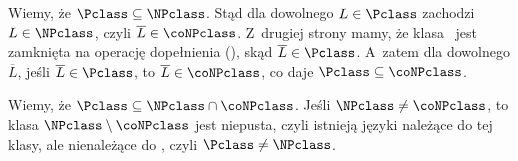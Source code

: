 \exercise %
Wiemy, że $\Pclass\subseteq\NPclass$.
Stąd dla dowolnego $L\in\Pclass$ zachodzi $L\in\NPclass$, czyli $\overline{L}\in\coNPclass$.
Z~drugiej strony mamy, że klasa \Pclass\ jest zamknięta na operację dopełnienia (), skąd $\overline{L}\in\Pclass$.
A~zatem dla dowolnego $\overline{L}$, jeśli $\overline{L}\in\Pclass$, to $\overline{L}\in\coNPclass$, co daje $\Pclass\subseteq\coNPclass$.

\exercise %
Wiemy, że $\Pclass\subseteq\NPclass\cap\coNPclass$.
Jeśli $\NPclass\ne\coNPclass$, to klasa $\NPclass\setminus\coNPclass$ jest niepusta, czyli istnieją języki należące do tej klasy, ale nienależące do \Pclass, czyli $\Pclass\ne\NPclass$.

\exercise %
